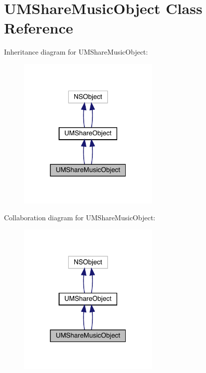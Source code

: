 \hypertarget{interface_u_m_share_music_object}{}\section{U\+M\+Share\+Music\+Object Class Reference}
\label{interface_u_m_share_music_object}


Inheritance diagram for U\+M\+Share\+Music\+Object\+:\nopagebreak
\begin{figure}[H]
\begin{center}
\leavevmode
\includegraphics[width=193pt]{interface_u_m_share_music_object__inherit__graph}
\end{center}
\end{figure}


Collaboration diagram for U\+M\+Share\+Music\+Object\+:\nopagebreak
\begin{figure}[H]
\begin{center}
\leavevmode
\includegraphics[width=193pt]{interface_u_m_share_music_object__coll__graph}
\end{center}
\end{figure}
